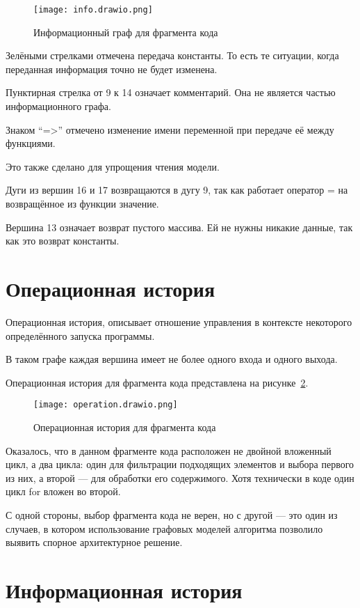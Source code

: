 \begin{figure}[h!]
  \texttt{[image: info.drawio.png]}
  \caption{Информационный граф для фрагмента кода}
  \label{fig:info}
\end{figure}

Зелёными стрелками отмечена передача константы. То есть те ситуации, когда переданная информация точно не будет изменена.

Пунктирная стрелка от 9 к 14 означает комментарий. Она не является частью информационного графа.

Знаком ``=>'' отмечено изменение имени переменной при передаче её между функциями.

Это также сделано для упрощения чтения модели.

Дуги из вершин 16 и 17 возвращаются в дугу 9, так как работает оператор = на возвращённое из функции значение.

Вершина 13 означает возврат пустого массива. Ей не нужны никакие данные, так как это возврат константы.

\section{Операционная история}

Операционная история, описывает отношение управления в контексте некоторого определённого запуска программы.

В таком графе каждая вершина имеет не более одного входа и одного выхода.

Операционная история для фрагмента кода представлена на рисунке~\ref{fig:operation}.

\begin{figure}[h!]
  \texttt{[image: operation.drawio.png]}
  \caption{Операционная история для фрагмента кода}
  \label{fig:operation}
\end{figure}

Оказалось, что в данном фрагменте кода расположен не двойной вложенный цикл, а два цикла: один для фильтрации подходящих элементов и выбора первого из них, а второй --- для обработки его содержимого. Хотя технически в коде один цикл for вложен во второй. 

С одной стороны, выбор фрагмента кода не верен, но с другой --- это один из случаев, в котором использование графовых моделей алгоритма позволило выявить спорное архитектурное решение.

\section{Информационная история}

